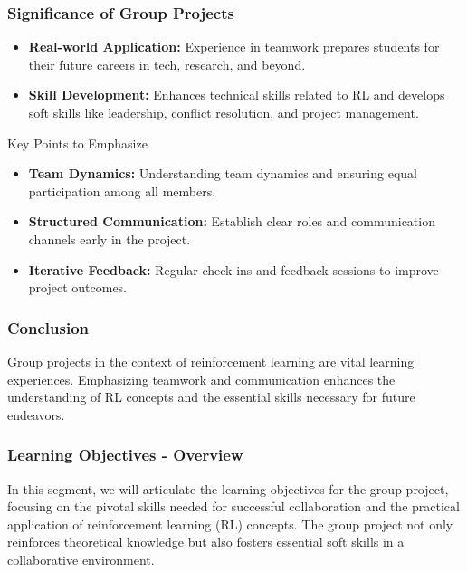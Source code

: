 \documentclass{beamer}
\begin{document}
\begin{frame}[fragile]
    \frametitle{Significance of Group Projects}
    \begin{itemize}
        \item \textbf{Real-world Application:} Experience in teamwork prepares students for their future careers in tech, research, and beyond.
        \item \textbf{Skill Development:} Enhances technical skills related to RL and develops soft skills like leadership, conflict resolution, and project management.
    \end{itemize}
    
    \begin{block}{Key Points to Emphasize}
        \begin{itemize}
            \item \textbf{Team Dynamics:} Understanding team dynamics and ensuring equal participation among all members.
            \item \textbf{Structured Communication:} Establish clear roles and communication channels early in the project.
            \item \textbf{Iterative Feedback:} Regular check-ins and feedback sessions to improve project outcomes.
        \end{itemize}
    \end{block}
\end{frame}

\begin{frame}[fragile]
    \frametitle{Conclusion}
    Group projects in the context of reinforcement learning are vital learning experiences. Emphasizing teamwork and communication enhances the understanding of RL concepts and the essential skills necessary for future endeavors.
\end{frame}

\begin{frame}[fragile]
    \frametitle{Learning Objectives - Overview}
    In this segment, we will articulate the learning objectives for the group project, focusing on the pivotal skills needed for successful collaboration and the practical application of reinforcement learning (RL) concepts. The group project not only reinforces theoretical knowledge but also fosters essential soft skills in a collaborative environment.
\end{frame}
\end{document}
